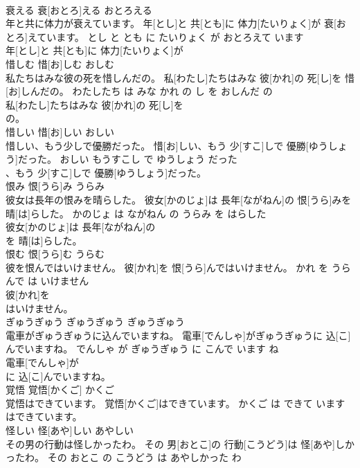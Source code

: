 \documentclass[8pt]{extreport}
\begin{document}
\begin{CJK}{UTF8}{min}
\\	衰える	衰[おとろ]える	おとろえる	
\\	年と共に体力が衰えています。	年[とし]と 共[とも]に 体力[たいりょく]が 衰[おとろ]えています。	とし と とも に たいりょく が おとろえて います	
\\	年[とし]と 共[とも]に 体力[たいりょく]が
\\	惜しむ	惜[お]しむ	おしむ	
\\	私たちはみな彼の死を惜しんだの。	私[わたし]たちはみな 彼[かれ]の 死[し]を 惜[お]しんだの。	わたしたち は みな かれ の し を おしんだ の	
\\	私[わたし]たちはみな 彼[かれ]の 死[し]を
\\	の。			
\\	惜しい	惜[お]しい	おしい	
\\	惜しい、もう少しで優勝だった。	惜[お]しい、もう 少[すこ]しで 優勝[ゆうしょう]だった。	おしい もうすこし で ゆうしょう だった	
\\	、もう 少[すこ]しで 優勝[ゆうしょう]だった。			
\\	恨み	恨[うら]み	うらみ	
\\	彼女は長年の恨みを晴らした。	彼女[かのじょ]は 長年[ながねん]の 恨[うら]みを 晴[は]らした。	かのじょ は ながねん の うらみ を はらした	
\\	彼女[かのじょ]は 長年[ながねん]の
\\	を 晴[は]らした。			
\\	恨む	恨[うら]む	うらむ	
\\	彼を恨んではいけません。	彼[かれ]を 恨[うら]んではいけません。	かれ を うらんで は いけません	
\\	彼[かれ]を
\\	はいけません。			
\\	ぎゅうぎゅう	ぎゅうぎゅう	ぎゅうぎゅう	
\\	電車がぎゅうぎゅうに込んでいますね。	電車[でんしゃ]がぎゅうぎゅうに 込[こ]んでいますね。	でんしゃ が ぎゅうぎゅう に こんで います ね	
\\	電車[でんしゃ]が
\\	に 込[こ]んでいますね。			
\\	覚悟	覚悟[かくご]	かくご	
\\	覚悟はできています。	覚悟[かくご]はできています。	かくご は できて います	
\\	はできています。			
\\	怪しい	怪[あや]しい	あやしい	
\\	その男の行動は怪しかったわ。	その 男[おとこ]の 行動[こうどう]は 怪[あや]しかったわ。	その おとこ の こうどう は あやしかった わ	

\end{CJK}
\end{document}
